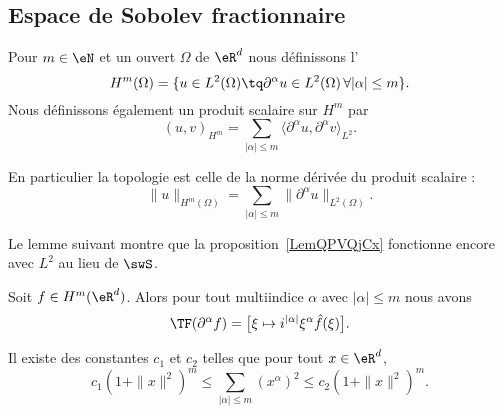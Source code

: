 \subsection{Espace de Sobolev fractionnaire}

\begin{definition}
    Pour \( m\in \eN\) et un ouvert \( \Omega\) de \( \eR^d\) nous définissons l'
    \begin{equation}
        H^m(\Omega)=\{ u\in L^2(\Omega)\tq \partial^{\alpha}u\in L^2(\Omega)\,\forall | \alpha |\leq m \}.
    \end{equation}
    Nous définissons également un produit scalaire sur \( H^m\) par
    \begin{equation}
        (u,v)_{H^m}=\sum_{| \alpha |\leq m}\langle \partial^{\alpha}u,  \partial^{\alpha}v  \rangle_{L^2}.
    \end{equation}
\end{definition}
En particulier la topologie est celle de la norme dérivée du produit scalaire :
\begin{equation}        \label{EQooMCWMooKKTqzM}
    \| u \|_{H^m(\Omega)}=\sum_{| \alpha |\leq m}\| \partial^{\alpha}u \|_{L^2(\Omega)}.
\end{equation}

Le lemme suivant montre que la proposition~\ref{LemQPVQjCx} fonctionne encore avec \( L^2\) au lieu de \( \swS\).
\begin{lemma} \label{LEMooAGBZooWCbPDd}
   Soit \( f\in H^m(\eR^d)\). Alors pour tout multiindice \( \alpha\) avec \( | \alpha |\leq m\) nous avons
   \begin{equation}
       \TF(\partial^{\alpha}f)=\big[ \xi\mapsto i^{| \alpha |}\xi^{\alpha}\hat f(\xi) \big].
   \end{equation}
\end{lemma}

\begin{lemma}
    Il existe des constantes \( c_1\) et \( c_2\) telles que pour tout \( x\in \eR^d\),
    \begin{equation}
        c_1(1+\| x \|^2)^m\leq \sum_{| \alpha |\leq m}(x^{\alpha})^2\leq c_2(1+\| x \|^2)^m.
    \end{equation}
\end{lemma}

